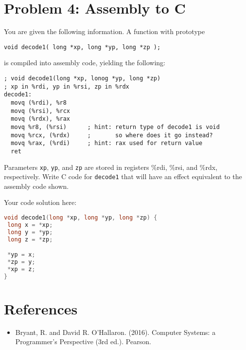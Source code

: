 \documentclass{article}
\begin{document}
\newpage
\section{Problem 4: Assembly to C}
You are given the following information. A function with prototype
\begin{lstlisting}
void decode1( long *xp, long *yp, long *zp );
\end{lstlisting}

is compiled into assembly code, yielding the following:
\begin{lstlisting}[language={[x86masm]assembler}]
; void decode1(long *xp, lonog *yp, long *zp)
; xp in %rdi, yp in %rsi, zp in %rdx
decode1:
  movq (%rdi), %r8
  movq (%rsi), %rcx
  movq (%rdx), %rax
  movq %r8, (%rsi)      ; hint: return type of decode1 is void
  movq %rcx, (%rdx)     ;       so where does it go instead?
  movq %rax, (%rdi)     ; hint: rax used for return value
  ret
\end{lstlisting}
Parameters \texttt{xp}, \texttt{yp}, and \texttt{zp} are stored in registers \%rdi, \%rsi, and \%rdx, respectively. Write C code for \texttt{decode1} that will have an effect equivalent to the assembly code shown.

Your code solution here:
\begin{lstlisting}[language={C}]
void decode1(long *xp, long *yp, long *zp) {
 long x = *xp;
 long y = *yp;
 long z = *zp;

 *yp = x;
 *zp = y;
 *xp = z;
}

\end{lstlisting}


\section{References}
\begin{itemize}
    \item Bryant, R. and David R. O'Hallaron. (2016). Computer Systems: a Programmer's Perspective (3rd ed.). Pearson.
\end{itemize}
\end{document}
